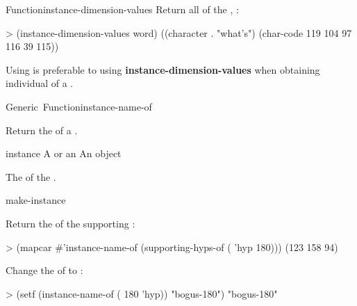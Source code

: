 \documentclass[10pt,twoside,english,pdftex]{article}
\begin{document}
\begin{functiondoc}{Function}{instance-dimension-values}
Return all  of the , :
%
\W\supp
\begin{example}
> (instance-dimension-values word)
((character . "what's") (char-code 119 104 97 116 39 115))
\end{example}

\fnnote Using \textbf{} is preferable to
using \textbf{instance-dimension-values} when obtaining individual
 of a .

\end{functiondoc}


\begin{functiondoc}{Generic~Function}{instance-name-of}{
    \returns{} }

\fnsyntax

\fnpurpose
Return the  of a .

\fnsetf
{}

\fnmethods
{}%
  {\code{(} 
  \returns{} }
%
  {\code{(} 
  \returns{} }

\fnpackage {}

\fnmodule {}

\fnargs
\begin{args}{instance}
\arg[instance] A  or an 
 An object
\end{args}

\fnreturns The  of the .

\begin{alsos}{make-instance}
\end{alsos}

\fnexamples
{}%
Return the  of the  supporting
  :
%
\W\supp
\begin{example}
> (mapcar #'instance-name-of 
          (supporting-hyps-of ( 'hyp 180)))
(123 158 94)
\end{example}
%
%
%
Change the  of   to 
:
%
\W\supp\notpretop
\begin{example}
> (setf (instance-name-of ( 180 'hyp)) "bogus-180")
"bogus-180"
\end{example}

\end{functiondoc}
\end{document}
